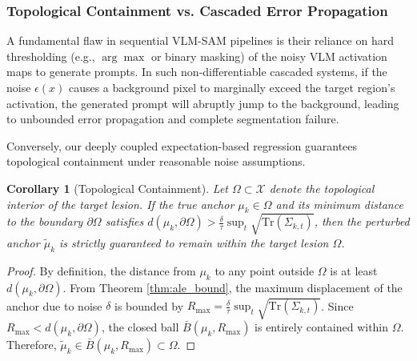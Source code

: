 \documentclass[onecolumn]{IEEEtran}
\numberwithin{equation}{section}
\newtheorem{corollary}[theorem]{Corollary}
\theoremstyle{definition}
\theoremstyle{remark}
\begin{document}
\subsubsection{Topological Containment vs. Cascaded Error Propagation}

A fundamental flaw in sequential VLM-SAM pipelines \cite{aleem2024test, li2024clipsam} is their reliance on hard thresholding (e.g., $\arg\max$ or binary masking) of the noisy VLM activation maps to generate prompts. In such non-differentiable cascaded systems, if the noise $\epsilon(x)$ causes a background pixel to marginally exceed the target region's activation, the generated prompt will abruptly jump to the background, leading to unbounded error propagation and complete segmentation failure.

Conversely, our deeply coupled expectation-based regression guarantees topological containment under reasonable noise assumptions.

\begin{corollary}[Topological Containment]
\label{cor:containment}
Let $\Omega \subset \mathcal{X}$ denote the topological interior of the target lesion. If the true anchor $\mu_k \in \Omega$ and its minimum distance to the boundary $\partial \Omega$ satisfies $d(\mu_k, \partial \Omega) > \frac{\delta}{\tau} \sup_t \sqrt{\mathrm{Tr}(\Sigma_{k, t})}$, then the perturbed anchor $\tilde{\mu}_k$ is strictly guaranteed to remain within the target lesion $\Omega$.
\end{corollary}

\begin{proof}
By definition, the distance from $\mu_k$ to any point outside $\Omega$ is at least $d(\mu_k, \partial \Omega)$. From Theorem \ref{thm:ale_bound}, the maximum displacement of the anchor due to noise $\delta$ is bounded by $R_{\max} = \frac{\delta}{\tau} \sup_t \sqrt{\mathrm{Tr}(\Sigma_{k, t})}$. Since $R_{\max} < d(\mu_k, \partial \Omega)$, the closed ball $\bar{B}(\mu_k, R_{\max})$ is entirely contained within $\Omega$. Therefore, $\tilde{\mu}_k \in \bar{B}(\mu_k, R_{\max}) \subset \Omega$.
\end{proof}
\end{document}

